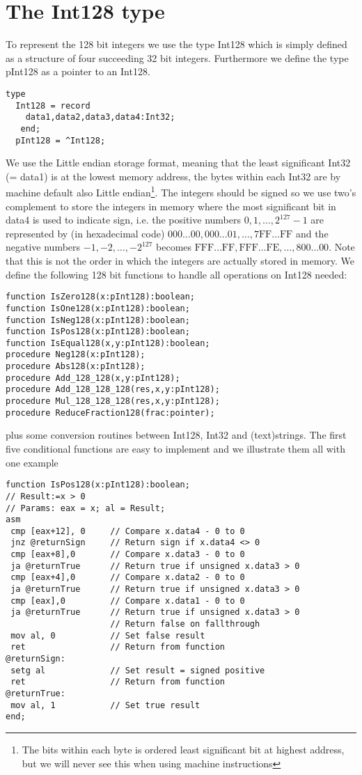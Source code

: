 \section{The Int128 type}
To represent the 128 bit integers we use the type Int128 which is simply defined as a structure of four succeeding 32 bit integers. Furthermore we define the type pInt128 as a pointer to an Int128. 
\begin{verbatim}
type
  Int128 = record
    data1,data2,data3,data4:Int32;
   end;
  pInt128 = ^Int128;
\end{verbatim}
We use the Little endian storage format, meaning that the least significant Int32 (= data1) is at the lowest memory address, the bytes within each Int32 are by machine default also Little endian\footnote{The bits within each byte is ordered least significant bit at highest address, but we will never see this when using machine instructions}. 
The integers should be signed so we use two's complement to store the integers in memory where the most significant bit in data4 is used to indicate sign, i.e. the positive numbers $0,1,\dots,2^{127}-1$ are represented by (in hexadecimal code) $\mbox{000}\dots\mbox{00},\mbox{000}\dots\mbox{01},\dots,\mbox{7FF}\dots\mbox{FF}$ and the negative numbers $-1,-2,\dots,-2^{127}$ becomes $\mbox{FFF}\dots\mbox{FF},\mbox{FFF}\dots\mbox{FE},\dots,\mbox{800}\dots\mbox{00}$. Note that this is not the order in which the integers are actually stored in memory.
We define the following 128 bit functions to handle all operations on Int128 needed: 
{\tiny
\begin{verbatim}
function IsZero128(x:pInt128):boolean;
function IsOne128(x:pInt128):boolean;
function IsNeg128(x:pInt128):boolean;
function IsPos128(x:pInt128):boolean;
function IsEqual128(x,y:pInt128):boolean;
procedure Neg128(x:pInt128);
procedure Abs128(x:pInt128);
procedure Add_128_128(x,y:pInt128);
procedure Add_128_128_128(res,x,y:pInt128);
procedure Mul_128_128_128(res,x,y:pInt128);
procedure ReduceFraction128(frac:pointer);
\end{verbatim}
}
\noindent
plus some conversion routines between Int128, Int32 and (text)strings.
The first five conditional functions are easy to implement and we illustrate them all with one example    
{\tiny
\begin{verbatim}
function IsPos128(x:pInt128):boolean;
// Result:=x > 0
// Params: eax = x; al = Result;
asm
 cmp [eax+12], 0     // Compare x.data4 - 0 to 0
 jnz @returnSign     // Return sign if x.data4 <> 0    
 cmp [eax+8],0       // Compare x.data3 - 0 to 0
 ja @returnTrue      // Return true if unsigned x.data3 > 0
 cmp [eax+4],0       // Compare x.data2 - 0 to 0
 ja @returnTrue      // Return true if unsigned x.data3 > 0
 cmp [eax],0         // Compare x.data1 - 0 to 0
 ja @returnTrue      // Return true if unsigned x.data3 > 0
                     // Return false on fallthrough
 mov al, 0           // Set false result
 ret                 // Return from function
@returnSign:
 setg al             // Set result = signed positive
 ret                 // Return from function
@returnTrue:
 mov al, 1           // Set true result
end;
\end{verbatim}
}
